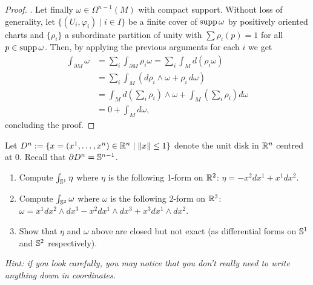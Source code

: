\begin{proof}
  .
  Let finally $\omega\in\Omega^{n-1}(M)$ with compact support.
  Without loss of generality, let $\{(U_i, \varphi_i)\mid i\in I\}$ be a finite cover of $\operatorname{supp} \omega$ by positively oriented charts and $\{\rho_i\}$ a subordinate partition of unity with $\sum \rho_i(p) = 1$ for all $p\in\operatorname{supp} \omega$.
  Then, by applying the previous arguments for each $i$ we get
  \begin{align}
    \int_{\partial M} \omega
     & = \sum_i \int_{\partial M} \rho_i\omega
    = \sum_i \int_M d(\rho_i \omega)                                                                \\
     & = \sum_i \int_M (d\rho_i \wedge\omega + \rho_i\, d\omega)                                    \\
     & = \int_M d\left(\sum_i \rho_i\right)\wedge\omega + \int_M \left(\sum_i \rho_i\right) d\omega \\
     & = 0 + \int_M d\omega,
  \end{align}
  concluding the proof.
\end{proof}

\begin{exercise}
  Let $D^n := \{x=(x^1, \ldots, x^n)\in\mathbb{R}^n \mid \|x\| \leq 1\}$ denote the unit disk in $\mathbb{R}^n$ centred at $0$. Recall that $\partial D^n = \mathbb{S}^{n-1}$.
  \begin{enumerate}
    \item Compute $\int_{\mathbb{S}^1} \eta$ where $\eta$ is the following 1-form on $\mathbb{R}^2$: $\eta = -x^2 dx^1 + x^1 dx^2$.
    \item Compute $\int_{\mathbb{S}^2} \omega$ where $\omega$ is the following 2-form on $\mathbb{R}^3$: $\omega = x^1 dx^2\wedge dx^3 - x^2 dx^1\wedge dx^3 + x^3 dx^1\wedge dx^2$.
    \item Show that $\eta$ and $\omega$ above are closed but not exact (as differential forms on $\mathbb{S}^1$ and $\mathbb{S}^2$ respectively).
  \end{enumerate}
  \textit{\small Hint: if you look carefully, you may notice that you don't really need to write anything down in coordinates.}
\end{exercise}

